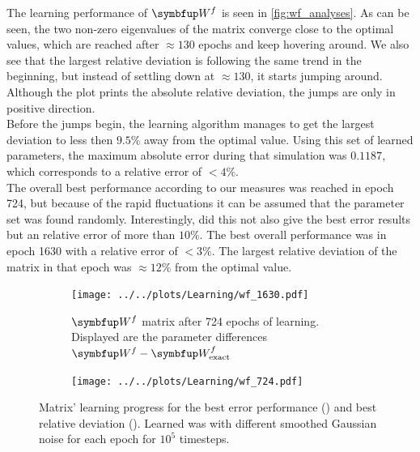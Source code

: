 The learning performance of $\bmu{W}^f$ is seen in \cref{fig:wf_analyses}. As can be seen, the two non-zero eigenvalues of the matrix converge close to the
optimal values, which are reached after $\approx 130$ epochs and keep hovering around. We also see that the largest relative deviation is following the same trend in the beginning, but instead of settling down at $\approx 130$, it starts jumping around. Although the plot prints the absolute relative deviation, the jumps are only in positive direction.\\
Before the jumps begin, the learning algorithm manages to get the largest deviation to less then $9.5\%$ away from the optimal value. Using this set of learned parameters, the maximum absolute error during that simulation was $0.1187$, which corresponds to a relative error of $<4\%$.\\
The overall best performance according to our measures was reached in epoch 724, but because of the rapid fluctuations it can be assumed that the parameter set was found randomly. Interestingly, did this not also give the best error results but an relative error of more than $10\%$. The best overall performance was in epoch 1630 with a relative error of $<3\%$. The largest relative deviation of the matrix  in that epoch was $\approx 12\%$ from the optimal value.\\
\begin{figure}
	\centering
	\begin{subfigure}[t]{0.48\textwidth}
		\texttt{[image: ../../plots/Learning/wf\_1630.pdf]}
		\caption{$\bmu{W}^f$ matrix after 724 epochs of learning. Displayed are the parameter differences $\bmu{W}^f - \bmu{W}^f_{\text{exact}}$ }  %
		\label{fig:subfig1}  %
	\end{subfigure}
	\hspace{0.02\textwidth}  %
	\begin{subfigure}[t]{0.48\textwidth}
		\texttt{[image: ../../plots/Learning/wf\_724.pdf]}
		\label{fig:subfig2}  %
	\end{subfigure}
\caption{Matrix' learning progress for the best error performance () and best relative deviation (). Learned was with different smoothed Gaussian noise for each epoch for $10^5$ timesteps.}
\label{fig:epoch_viz}
\end{figure}
